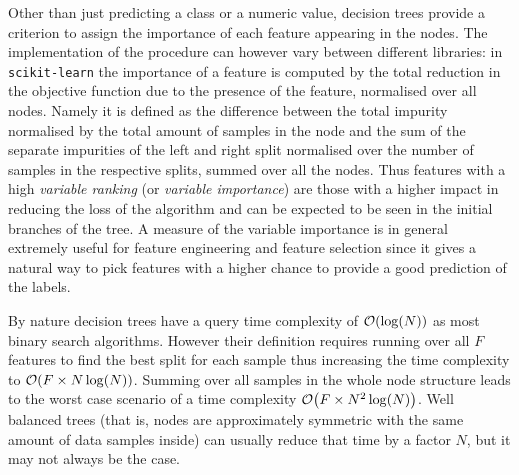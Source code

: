 Other than just predicting a class or a numeric value, decision trees provide a criterion to assign the importance of each feature appearing in the nodes.
The implementation of the procedure can however vary between different libraries: in \texttt{scikit-learn} the importance of a feature is computed by the total reduction in the objective function due to the presence of the feature, normalised over all nodes.
Namely it is defined as the difference between the total impurity normalised by the total amount of samples in the node and the sum of the separate impurities of the left and right split normalised over the number of samples in the respective splits, summed over all the nodes.
Thus features with a high \textit{variable ranking} (or \textit{variable importance}) are those with a higher impact in reducing the loss of the algorithm and can be expected to be seen in the initial branches of the tree.
A measure of the variable importance is in general extremely useful for feature engineering and feature selection since it gives a natural way to pick features with a higher chance to provide a good prediction of the labels.

By nature decision trees have a query time complexity of $\order{ \log(N) }$ as most binary search algorithms.
However their definition requires running over all $F$ features to find the best split for each sample thus increasing the time complexity to $\order{ F \times N \log( N ) }$.
Summing over all samples in the whole node structure leads to the worst case scenario of a time complexity $\order{ F \times N^2 \log( N ) }$.
Well balanced trees (that is, nodes are approximately symmetric with the same amount of data samples inside) can usually reduce that time by a factor $N$, but it may not always be the case.


